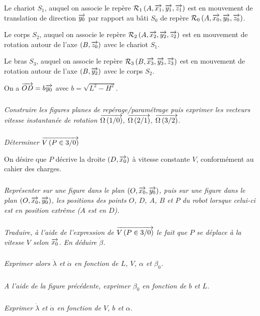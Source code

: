 \documentclass[10pt,fleqn]{article} %
\begin{document}
\begin{multicols}{2}
Le chariot $S_1$, auquel on associe le repère $\mathcal{R}_1\left(A,\overrightarrow{x_1},\overrightarrow{y_1},\overrightarrow{z_1}\right)$ est en mouvement de translation de direction $\overrightarrow{y_0}$ par rapport au bâti $S_0$ de repère $\mathcal{R}_0\left(A,\overrightarrow{x_0},\overrightarrow{y_0},\overrightarrow{z_0}\right)$. 

Le corps $S_2$, auquel on associe le repère $\mathcal{R}_2\left(A,\overrightarrow{x_2},\overrightarrow{y_2},\overrightarrow{z_2}\right)$ est en mouvement de rotation autour de l'axe $(B,\overrightarrow{z_0})$ avec le chariot $S_1$. 

Le bras $S_3$, auquel on associe le repère $\mathcal{R}_3\left(B,\overrightarrow{x_3},\overrightarrow{y_3},\overrightarrow{z_3}\right)$ est en mouvement de rotation autour de l'axe $(B,\overrightarrow{y_2})$ avec le corps $S_2$. 

On a $\overrightarrow{OD}=b\overrightarrow{y_0}$ avec $b=\sqrt{L^2-H^2}$.




\subparagraph{}
\textit{Construire les figures planes de repérage/paramétrage puis exprimer les vecteurs vitesse instantanée de rotation $\overrightarrow{\Omega\left( {1}/{0}\right)}$, $\overrightarrow{\Omega\left( {2}/{1}\right)}$, $\overrightarrow{\Omega\left( {3}/{2}\right)}$.}

\subparagraph{}
\textit{Déterminer $\overrightarrow{V\left( {P} \in {3}/{0}\right)}$}

On désire que $P$ décrive la droite $(D,\overrightarrow{x_0})$ à vitesse constante $V$, conformément au cahier des charges. 

\subparagraph{}
\textit{Représenter sur une figure dans le plan $(O,\overrightarrow{x_0},\overrightarrow{y_0})$, puis sur une figure dans le plan $(O,\overrightarrow{x_0},\overrightarrow{y_0})$, les positions des points $O$, $D$, $A$, $B$ et $P$ du robot lorsque celui-ci est en position extrême ($A$ est en $D$).}


\subparagraph{}
\textit{Traduire, à l'aide de l'expression de $\overrightarrow{V\left( {P} \in {3}/{0}\right)}$ le fait que $P$ se déplace à la vitesse $V$ selon $\overrightarrow{x_0}$. En déduire $\dot{\beta}$.}

\subparagraph{}
\textit{Exprimer alors $\dot{\lambda}$ et $\dot{\alpha}$ en fonction de $L$, $V$, $\alpha$ et $\beta_0$. }

\subparagraph{}
\textit{A l'aide de la figure précédente, exprimer $\beta_0$ en fonction de $b$ et $L$.}

\subparagraph{}
\textit{Exprimer $\dot{\lambda}$ et $\dot{\alpha}$ en fonction de $V$, $b$ et $\alpha$.}

\end{multicols}
\end{document}

